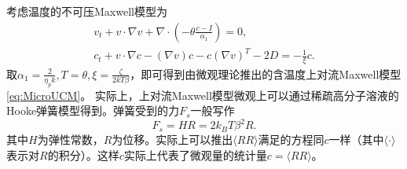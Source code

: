 	考虑温度的不可压Maxwell模型为
	\begin{eqnarray*}%
		v_t + v \cdot \nabla v + \nabla \cdot (-\theta \frac{c-I}{\alpha_1}) = 0, \\
		c_t + v \cdot \nabla c - (\nabla v) c - c (\nabla v)^T - 2 D = -\frac{1}{\xi} c.
	\end{eqnarray*}
	取$\alpha_1 = \frac{2}{\eta_p k}, T = \theta,\xi = \frac{\zeta}{2 kT \beta}$，即可得到由微观理论推出的含温度上对流Maxwell模型\eqref{eq:MicroUCM}。	实际上，上对流Maxwell模型微观上可以通过稀疏高分子溶液的Hooke弹簧模型得到\cite{larson1999structure,le2009multiscale}。弹簧受到的力$F_s$一般写作
	\begin{equation*}
		F_s = H R = 2 k_B T \beta^2 R.
	\end{equation*}
	其中$H$为弹性常数，$R$为位移。实际上可以推出$\langle RR \rangle$满足的方程同$c$一样（其中$\langle \cdot \rangle$表示对$R$的积分）\cite{larson1999structure}。这样$c$实际上代表了微观量的统计量$c = \langle RR \rangle$。

	

